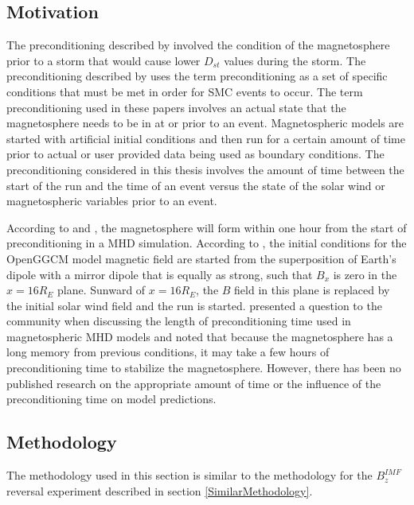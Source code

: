 \subsection{Motivation}
The preconditioning described by \citet{Lavraud2006} involved the condition of
the magnetosphere prior to a storm that would cause lower $D_{st}$ values during the storm. The preconditioning
described by \citet{Juusola2013} uses the term preconditioning as a set of specific
conditions that must be met in order for SMC events to occur. The term
preconditioning used in these papers involves an actual state that the
magnetosphere needs to be in at or prior to an event. Magnetospheric models are
started with artificial initial conditions and then run for a certain amount of
time prior to actual or user provided data being used as boundary conditions.
The preconditioning considered in this thesis involves the amount of time
between the start of the run and the time of an event versus the state of the solar wind or
magnetospheric variables prior to an event.

According to \citet{Raeder2003} and \citet{Buchner2003}, the magnetosphere will
form within one hour from the start of preconditioning in a MHD simulation.
According to \cite{Raeder1999}, the initial conditions for the OpenGGCM model magnetic field
are started from the superposition of Earth's dipole with a mirror dipole that
is equally as strong, such that $B_x$ is zero in the $x = 16R_E$ plane.
Sunward of $x = 16R_E$, the $B$ field in this plane is replaced by the initial
solar wind field and the run is started. \citet{Buchner2003} presented a question to the
community when discussing the length of preconditioning time used in magnetospheric MHD models and noted that because the magnetosphere has a long memory from previous
conditions, it may take a few hours of preconditioning time to stabilize
the magnetosphere.  However,
there has been no published research on the appropriate amount of time or the influence of the preconditioning time on model predictions.

\subsection{Methodology}
The methodology used in this section is similar to the methodology for the $B_z^{IMF}$ reversal experiment described in section
\ref{SimilarMethodology}. 


